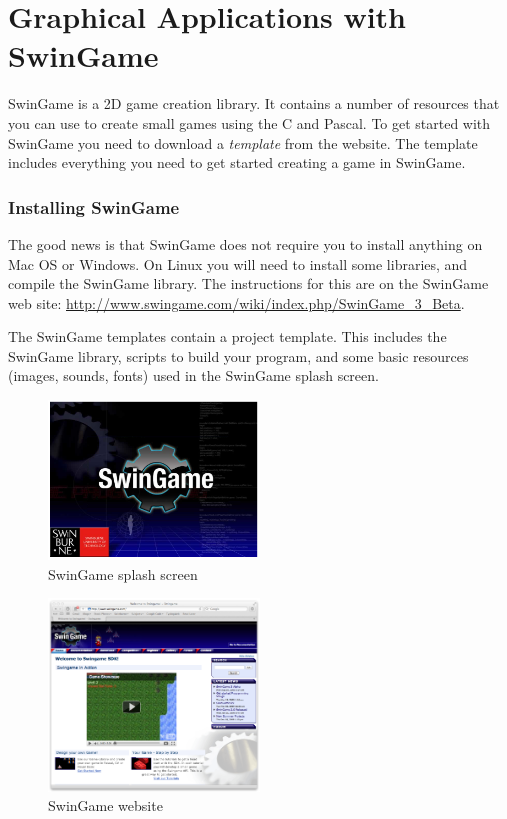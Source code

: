 \clearpage
\def\pageLang{none}
\section{Graphical Applications with SwinGame} %
\label{sub:graphical_applications_with_swingame}

SwinGame is a 2D game creation library. It contains a number of resources that you can use to create small games using the C and Pascal. To get started with SwinGame you need to download a \emph{template} from the website. The template includes everything you need to get started creating a game in SwinGame.

\subsubsection{Installing SwinGame} %
\label{ssub:installing_swingame}

The good news is that SwinGame does not require you to install anything on Mac OS or Windows. On Linux you will need to install some libraries, and compile the SwinGame library. The instructions for this are on the SwinGame web site: \url{http://www.swingame.com/wiki/index.php/SwinGame_3_Beta}.

The SwinGame templates contain a project template. This includes the SwinGame library, scripts to build your program, and some basic resources (images, sounds, fonts) used in the SwinGame splash screen.

\begin{figure}[h]
   \centering
   \includegraphics[width=0.5\textwidth]{./topics/programs-and-compilers/images/SwinGameSplash} 
   \caption{SwinGame splash screen}
   \label{fig:swingame-splash}
\end{figure}

\begin{figure}[h]
   \centering
   \includegraphics[width=0.5\textwidth]{./topics/programs-and-compilers/images/SwinGameSite} 
   \caption{SwinGame website}
   \label{fig:swingame-site}
\end{figure}



